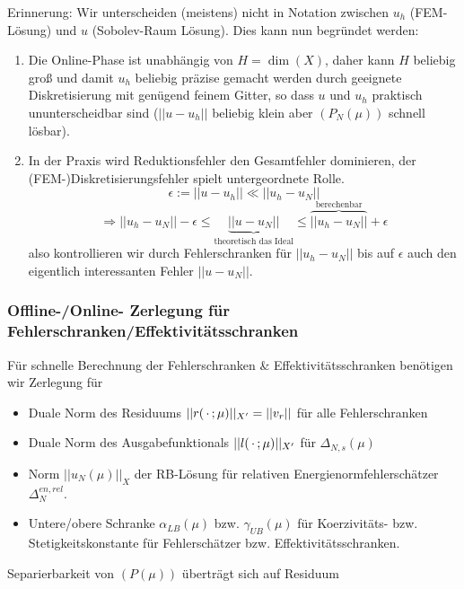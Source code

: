 \begin{bem}
	Erinnerung: Wir unterscheiden (meistens) nicht in Notation zwischen $u_h$ (FEM-Lösung) und $u$ (Sobolev-Raum Lösung). Dies kann nun begründet werden:
	\begin{enumerate}
		\item Die Online-Phase ist unabhängig von $H = \dim(X)$, daher kann $H$ beliebig groß und damit $u_h$ beliebig präzise gemacht werden durch geeignete Diskretisierung mit genügend feinem Gitter, so dass $u$ und $u_h$ praktisch ununterscheidbar sind ($||u - u_h ||$ beliebig klein aber $(P_N(\mu))$ schnell lösbar).
		\item In der Praxis wird Reduktionsfehler den Gesamtfehler dominieren, der (FEM-)Diskretisierungsfehler spielt untergeordnete Rolle.
		\[
			\epsilon := ||u - u_h|| \ll ||u_h - u_N||
		\]
		\[
			\Rightarrow ||u_h - u_N|| - \epsilon \leq \underbrace{||u-u_N||}_{\text{theoretisch das Ideal}} \leq \overbrace{||u_h - u_N||}^{\text{berechenbar}} + \epsilon
		\]
		also kontrollieren wir durch Fehlerschranken für $||u_h - u_N||$ bis auf $\epsilon$ auch den eigentlich interessanten Fehler $||u - u_N||$.
	\end{enumerate}
\end{bem}

\subsubsection*{Offline-/Online- Zerlegung für Fehlerschranken/Effektivitätsschranken}

Für schnelle Berechnung der Fehlerschranken \& Effektivitätsschranken benötigen wir Zerlegung für
\begin{itemize}
	\item Duale Norm des Residuums $|| r(\,\cdot\, ; \mu)||_{X'} = ||v_r||$ für alle Fehlerschranken
	\item Duale Norm des Ausgabefunktionals $|| l(\,\cdot\,;\mu)||_{X'}$ für $\Delta_{N,s}(\mu)$
	\item Norm $||u_N (\mu) ||_X$ der RB-Lösung für relativen Energienormfehlerschätzer $\Delta_N^{en, rel}$.
	\item Untere/obere Schranke $\alpha_{LB}(\mu)$ bzw. $\gamma_{UB} (\mu)$ für Koerzivitäts- bzw. Stetigkeitskonstante für Fehlerschätzer bzw. Effektivitätsschranken.
\end{itemize}
Separierbarkeit von $(P(\mu))$ überträgt sich auf Residuum

